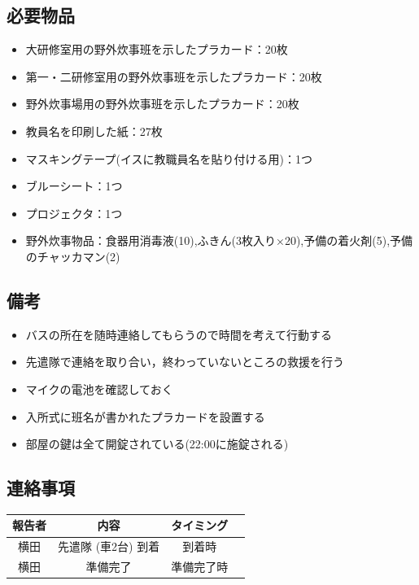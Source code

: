 \subsection{必要物品}
\begin{itemize}
\item 大研修室用の野外炊事班を示したプラカード：20枚
\item 第一・二研修室用の野外炊事班を示したプラカード：20枚
\item 野外炊事場用の野外炊事班を示したプラカード：20枚
\item 教員名を印刷した紙：27枚
\item マスキングテープ(イスに教職員名を貼り付ける用)：1つ
\item ブルーシート：1つ
\item プロジェクタ：1つ
\item 野外炊事物品：食器用消毒液(10),ふきん(3枚入り×20),予備の着火剤(5),予備のチャッカマン(2)
\end{itemize}


\subsection{備考}
\begin{itemize}
\item バスの所在を随時連絡してもらうので時間を考えて行動する
\item 先遣隊で連絡を取り合い，終わっていないところの救援を行う
\item マイクの電池を確認しておく
\item 入所式に班名が書かれたプラカードを設置する
\item 部屋の鍵は全て開錠されている(22:00に施錠される)
\end{itemize}


\subsection{連絡事項}
\begin{table}[h]
\begin{center}
\begin{tabular}{|c|c|c|c|}
\hline
報告者 & 内容 & タイミング \\ \hline \hline
横田 & 先遣隊 (車2台) 到着 & 到着時\\ \hline
横田 & 準備完了 & 準備完了時 \\ \hline
\end{tabular}
\end{center}
\end{table}

%
